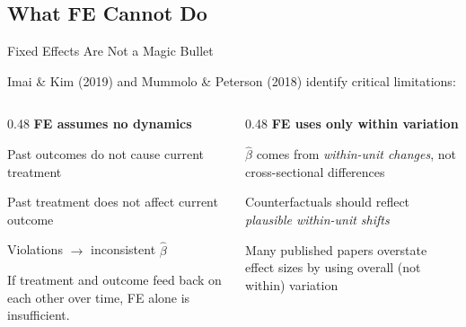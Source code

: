 \documentclass[9pt,aspectratio=169]{beamer}
\begin{document}
\subsection{What FE Cannot Do}
\begin{frame}{Fixed Effects Are Not a Magic Bullet}

Imai \& Kim (2019) and Mummolo \& Peterson (2018) identify critical limitations:

\bigskip

\begin{columns}[T]
\begin{column}{0.48\textwidth}
\textbf{FE assumes no dynamics}

\bi
    \item Past outcomes do not cause current treatment
    \item Past treatment does not affect current outcome
    \item Violations $\to$ inconsistent $\hat{\beta}$
\ei

\medskip

{\small If treatment and outcome feed back on each other over time, FE alone is insufficient.}
\end{column}
\begin{column}{0.48\textwidth}
\textbf{FE uses only within variation}

\bi
    \item $\hat{\beta}$ comes from \textit{within-unit changes}, not cross-sectional differences
    \item Counterfactuals should reflect \textit{plausible within-unit shifts}
    \item Many published papers overstate effect sizes by using overall (not within) variation
\ei
\end{column}
\end{columns}

\end{frame}
\end{document}
